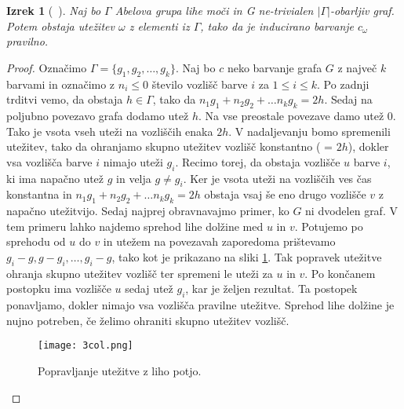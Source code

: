 \documentclass[12pt,a4paper,twoside]{article}
\theoremstyle{definition} %
\theoremstyle{plain} %
\newtheorem{izrek}[definicija]{Izrek}
\numberwithin{equation}{section}  %
\begin{document}
  \begin{izrek}[~\citet{base}]
  	Naj bo $\Gamma$ Abelova grupa lihe moči in G ne-trivialen $|\Gamma|$-obarljiv graf. Potem obstaja utežitev $\omega$ z elementi iz $\Gamma$, tako da je inducirano barvanje $c_{\omega}$ pravilno.
  \end{izrek}

\begin{proof}
	Označimo $\Gamma = \{g_1, g_2, \ldots, g_k\}$. Naj bo $c$ neko barvanje grafa $G$ z največ $k$ barvami in označimo z $n_i \le 0$ število vozlišč barve $i$ za $1 \le i \le k$. Po zadnji trditvi vemo, da obstaja $h \in \Gamma$, tako da $n_1g_1 + n_2g_2 + \ldots n_kg_k = 2h$. Sedaj na poljubno povezavo grafa dodamo utež $h$. Na vse preostale povezave damo utež $0$. Tako je vsota vseh uteži na vozliščih enaka $2h$. V nadaljevanju bomo spremenili utežitev, tako da ohranjamo skupno utežitev vozlišč konstantno ( = $2h$), dokler vsa vozlišča barve $i$ nimajo uteži $g_i$. Recimo torej, da obstaja vozlišče $u$ barve $i$, ki ima napačno utež $g$ in velja $g \neq g_i$. Ker je vsota uteži na vozliščih ves čas konstantna in $n_1g_1 + n_2g_2 + \ldots n_kg_k = 2h$ obstaja vsaj še eno drugo vozlišče $v$ z napačno utežitvijo. Sedaj najprej obravnavajmo primer, ko $G$ ni dvodelen graf. V tem primeru lahko najdemo sprehod lihe dolžine med $u$ in $v$. Potujemo po sprehodu od $u$ do $v$ in utežem na povezavah zaporedoma prištevamo $g_i - g, g - g_i, \ldots, g_i - g$, tako kot je prikazano na sliki \ref{im1}. Tak popravek utežitve ohranja skupno utežitev vozlišč ter spremeni le uteži za $u$ in $v$. Po končanem postopku ima vozlišče $u$ sedaj utež $g_i$, kar je željen rezultat. Ta postopek ponavljamo, dokler nimajo vsa vozlišča pravilne utežitve. Sprehod lihe dolžine je nujno potreben, če želimo ohraniti skupno utežitev vozlišč.
 \begin{figure}[h!]
\caption{Popravljanje utežitve z liho potjo.}
\label{im1}
\centering
    \texttt{[image: 3col.png]}
    \end{figure}
	

\end{proof}
\end{document}
